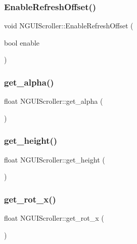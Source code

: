 \subsubsection{\texorpdfstring{Enable\+Refresh\+Offset()}{EnableRefreshOffset()}}
{\footnotesize\ttfamily void N\+G\+U\+I\+Scroller\+::\+Enable\+Refresh\+Offset (\begin{DoxyParamCaption}\item[{bool}]{enable }\end{DoxyParamCaption})}

\hypertarget{class_n_g_u_i_scroller_a3d6ed609e87e7135922424b243c4eaa7}{}\label{class_n_g_u_i_scroller_a3d6ed609e87e7135922424b243c4eaa7} 
\subsubsection{\texorpdfstring{get\+\_\+alpha()}{get\_alpha()}}
{\footnotesize\ttfamily float N\+G\+U\+I\+Scroller\+::get\+\_\+alpha (\begin{DoxyParamCaption}{ }\end{DoxyParamCaption})}

\hypertarget{class_n_g_u_i_scroller_a4b75b64d2a18a879e221239834c46a6e}{}\label{class_n_g_u_i_scroller_a4b75b64d2a18a879e221239834c46a6e} 
\subsubsection{\texorpdfstring{get\+\_\+height()}{get\_height()}}
{\footnotesize\ttfamily float N\+G\+U\+I\+Scroller\+::get\+\_\+height (\begin{DoxyParamCaption}{ }\end{DoxyParamCaption})}

\hypertarget{class_n_g_u_i_scroller_a8b5aec4af39877867abe24c7ac6649e8}{}\label{class_n_g_u_i_scroller_a8b5aec4af39877867abe24c7ac6649e8} 
\subsubsection{\texorpdfstring{get\+\_\+rot\+\_\+x()}{get\_rot\_x()}}
{\footnotesize\ttfamily float N\+G\+U\+I\+Scroller\+::get\+\_\+rot\+\_\+x (\begin{DoxyParamCaption}{ }\end{DoxyParamCaption})}

